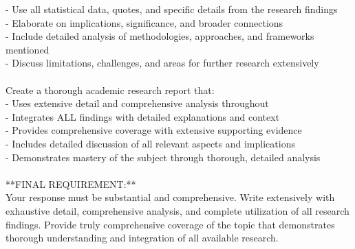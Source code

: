 \documentclass{article} %
\begin{document}
\begin{examplebox}
- Use all statistical data, quotes, and specific details from the research findings\\
- Elaborate on implications, significance, and broader connections\\
- Include detailed analysis of methodologies, approaches, and frameworks mentioned\\
- Discuss limitations, challenges, and areas for further research extensively\\
\\
Create a thorough academic research report that:\\
- Uses extensive detail and comprehensive analysis throughout\\
- Integrates ALL findings with detailed explanations and context\\
- Provides comprehensive coverage with extensive supporting evidence\\
- Includes detailed discussion of all relevant aspects and implications\\
- Demonstrates mastery of the subject through thorough, detailed analysis\\
\\
**FINAL REQUIREMENT:**\\
Your response must be substantial and comprehensive. Write extensively with exhaustive detail, comprehensive analysis, and complete utilization of all research findings. Provide truly comprehensive coverage of the topic that demonstrates thorough understanding and integration of all available research.
\end{examplebox}
\end{document}
